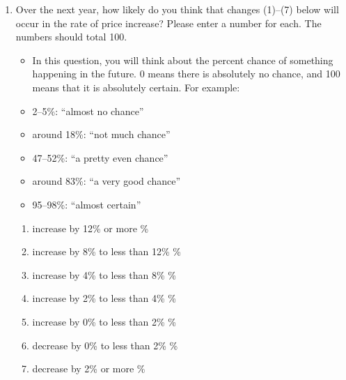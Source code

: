 \documentclass[a4paper,12pt]{article}
\begin{document}
\begin{enumerate}
\item[Q.5.] Over the next year, how likely do you think that changes (1)--(7) below
will occur in the rate of price increase? Please enter a number for each. The numbers
should total 100.
	\begin{itemize}
	\item[] In this question, you will think about the percent chance of something
	happening in the future. 0 means there is absolutely no chance, and 100 means that
	it is absolutely certain. For example:
	\end{itemize}
	\begin{itemize}
	\item[] 2--5\%: ``almost no chance''
	\item[] around 18\%: ``not much chance''
	\item[] 47--52\%: ``a pretty even chance''
	\item[] around 83\%: ``a very good chance''
	\item[] 95--98\%: ``almost certain''
	\end{itemize}
	\begin{enumerate}[(1)]
	\item increase by 12\% or more \hfill \underline{\hspace{20mm}} \%
	\item increase by 8\% to less than 12\% \hfill \underline{\hspace{20mm}} \%
	\item increase by 4\% to less than 8\% \hfill \underline{\hspace{20mm}} \%
	\item increase by 2\% to less than 4\% \hfill \underline{\hspace{20mm}} \%
	\item increase by 0\% to less than 2\% \hfill \underline{\hspace{20mm}} \%
	\item decrease by 0\% to less than 2\% \hfill \underline{\hspace{20mm}} \%
	\item decrease by 2\% or more \hfill \underline{\hspace{20mm}} \%
	\end{enumerate}
	
\


\end{enumerate}
\end{document}
